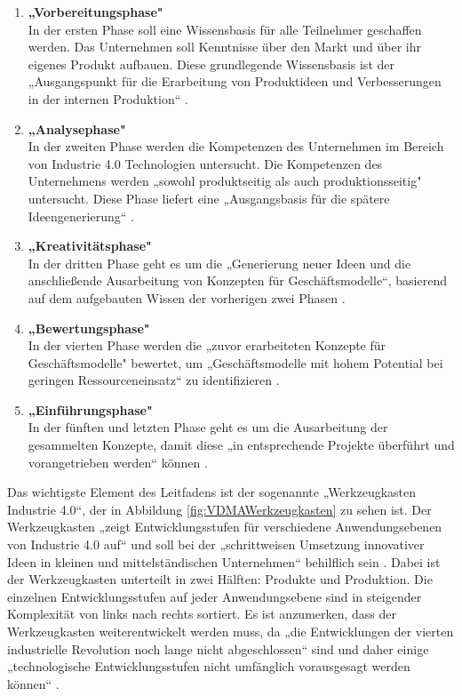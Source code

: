 \begin{enumerate}
	\item \textbf{„Vorbereitungsphase"} \cite[S.10]{2} \\ In der ersten Phase soll eine Wissensbasis für alle Teilnehmer geschaffen werden. Das Unternehmen soll Kenntnisse über den Markt und über ihr eigenes Produkt aufbauen. Diese grundlegende Wissensbasis ist der „Ausgangspunkt für die Erarbeitung von Produktideen und Verbesserungen in der internen Produktion“ \cite[S.10]{2}.
	\item \textbf{„Analysephase"} \cite[S.10]{2} \\ In der zweiten Phase werden die Kompetenzen des Unternehmen im Bereich von Industrie 4.0 Technologien untersucht. Die Kompetenzen des Unternehmens werden „sowohl produktseitig als auch produktionsseitig" \cite[S.10]{2} untersucht. Diese Phase liefert eine „Ausgangsbasis für die spätere Ideengenerierung“ \cite[S.10]{2}.
	\item \textbf{„Kreativitätsphase"} \cite[S.10]{2} \\ In der dritten Phase geht es um die „Generierung neuer Ideen und die anschließende Ausarbeitung von Konzepten für Geschäftsmodelle“\cite[S.10]{2}, basierend auf dem aufgebauten Wissen der vorherigen zwei Phasen \cite[S.10]{2}.
	\item \textbf{„Bewertungsphase"} \cite[S.10]{2} \\ In der vierten Phase werden die „zuvor erarbeiteten Konzepte für Geschäftsmodelle" \cite[S.10]{2} bewertet, um „Geschäftsmodelle mit hohem Potential bei geringen Ressourceneinsatz“ \cite[S.10]{2} zu identifizieren \cite[S.10]{2}.
	\item \textbf{„Einführungsphase"} \cite[S.10]{2} \\ In der fünften und letzten Phase geht es um die Ausarbeitung der gesammelten Konzepte, damit diese „in entsprechende Projekte überführt und vorangetrieben werden“ \cite[S.10]{2} können \cite[S.10]{2}.
\end{enumerate}
Das wichtigste Element des Leitfadens ist der sogenannte „Werkzeugkasten Industrie 4.0“, der in  Abbildung \ref{fig:VDMAWerkzeugkasten} zu sehen ist. Der Werkzeugkasten „zeigt Entwicklungsstufen für verschiedene Anwendungsebenen von Industrie 4.0 auf“ \cite[S.11]{2} und soll bei der „schrittweisen Umsetzung innovativer Ideen in kleinen und mittelständischen Unternehmen“ behilflich sein \cite[S.11]{2}. Dabei ist der Werkzeugkasten unterteilt in zwei Hälften: Produkte und Produktion. Die einzelnen Entwicklungsstufen auf jeder Anwendungsebene sind in steigender Komplexität von links nach rechts sortiert. Es ist anzumerken, dass der Werkzeugkasten weiterentwickelt werden muss, da „die Entwicklungen der vierten industrielle Revolution noch lange nicht abgeschlossen“ \cite[S.11]{2} sind und daher einige „technologische Entwicklungsstufen nicht umfänglich vorausgesagt werden können“ \cite[S.11]{2}.
